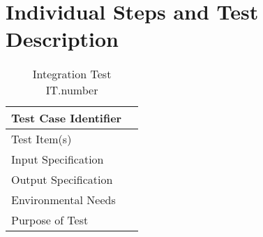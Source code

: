 \documentclass[../../testPlan.tex]{subfiles}
\begin{document}
	\chapter{Individual Steps and Test Description}

		\begin{table}[H]
			\centering
			\label{ITnumber}
			\begin{tabular}{ll}
				\hline
				Test Case Identifier &  \\ \hline
				Test Item(s)         &  \\ \hline
				Input Specification  &  \\ \hline
				Output Specification &  \\ \hline
				Environmental Needs  &  \\ \hline
				Purpose of Test      &  \\ \hline
			\end{tabular}
			\caption{Integration Test IT.number}
		\end{table}
\end{document}
